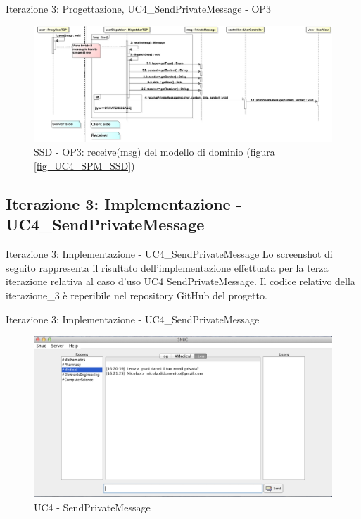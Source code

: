 \begin{frame} {Iterazione 3: Progettazione, UC4\_SendPrivateMessage - OP3}
   \begin{figure}
     \includegraphics[scale=0.14]{image_astah/Iteration_3_DesignModel/UC4_SendPrivateMessage_SSD_3_receive.png}{\centering}
     \caption{SSD - OP3: receive(msg) del modello di dominio (figura \ref{fig_UC4_SPM_SSD})}
     \label{fig_UC4_SSD_SRM_3} 
   \end{figure}
\end{frame}


\subsection {Iterazione 3: Implementazione - UC4\_SendPrivateMessage}
 \begin{frame} {Iterazione 3: Implementazione - UC4\_SendPrivateMessage }
   Lo screenshot di seguito rappresenta il risultato dell'implementazione effettuata per la terza iterazione relativa al caso d'uso UC4 SendPrivateMessage.
   \newline
   Il codice relativo della iterazione\_3 è reperibile nel repository GitHub del progetto.
 \end{frame}

\begin{frame} {Iterazione 3: Implementazione - UC4\_SendPrivateMessage}
    \begin{figure}
    \includegraphics[scale=0.32]{image_implementation/uc4/10.png}{\centering}
    \caption{UC4 - SendPrivateMessage }
   \end{figure}
\end{frame}

